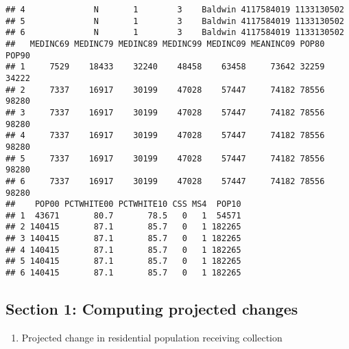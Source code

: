 \documentclass[]{article}
\newenvironment{Shaded}{\begin{snugshade}}{\end{snugshade}}
\newcommand{\KeywordTok}[1]{\textcolor[rgb]{0.13,0.29,0.53}{\textbf{#1}}}
\newcommand{\StringTok}[1]{\textcolor[rgb]{0.31,0.60,0.02}{#1}}
\newcommand{\CommentTok}[1]{\textcolor[rgb]{0.56,0.35,0.01}{\textit{#1}}}
\newcommand{\OperatorTok}[1]{\textcolor[rgb]{0.81,0.36,0.00}{\textbf{#1}}}
\newcommand{\NormalTok}[1]{#1}
\providecommand{\tightlist}{%
  \setlength{\itemsep}{0pt}\setlength{\parskip}{0pt}}
\begin{document}
\begin{verbatim}
## 4              N       1        3    Baldwin 4117584019 1133130502
## 5              N       1        3    Baldwin 4117584019 1133130502
## 6              N       1        3    Baldwin 4117584019 1133130502
##   MEDINC69 MEDINC79 MEDINC89 MEDINC99 MEDINC09 MEANINC09 POP80 POP90
## 1     7529    18433    32240    48458    63458     73642 32259 34222
## 2     7337    16917    30199    47028    57447     74182 78556 98280
## 3     7337    16917    30199    47028    57447     74182 78556 98280
## 4     7337    16917    30199    47028    57447     74182 78556 98280
## 5     7337    16917    30199    47028    57447     74182 78556 98280
## 6     7337    16917    30199    47028    57447     74182 78556 98280
##    POP00 PCTWHITE00 PCTWHITE10 CSS MS4  POP10
## 1  43671       80.7       78.5   0   1  54571
## 2 140415       87.1       85.7   0   1 182265
## 3 140415       87.1       85.7   0   1 182265
## 4 140415       87.1       85.7   0   1 182265
## 5 140415       87.1       85.7   0   1 182265
## 6 140415       87.1       85.7   0   1 182265
\end{verbatim}

\begin{Shaded}
\end{Shaded}

\subsection{Section 1: Computing projected
changes}\label{section-1-computing-projected-changes}

\begin{enumerate}
\def\labelenumi{\arabic{enumi}.}
\tightlist
\item
  Projected change in residential population receiving collection
\end{enumerate}

\begin{Shaded}
\end{Shaded}
\end{document}

